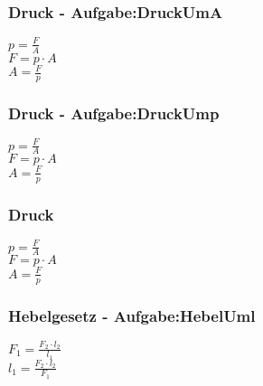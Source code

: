 \subsubsection{Druck - Aufgabe:DruckUmA} 
\begin{minipage}{0.45\textwidth} 
$ p = \frac{F}{A} $\\ 
$ F = p\cdot A $\\ 
$ A = \frac{F}{p} $\\ 
\end{minipage} 
\begin{minipage}{0.45\textwidth} 
 
\end{minipage} 
\subsubsection{Druck - Aufgabe:DruckUmp} 
\begin{minipage}{0.45\textwidth} 
$ p = \frac{F}{A} $\\ 
$ F = p\cdot A $\\ 
$ A = \frac{F}{p} $\\ 
\end{minipage} 
\begin{minipage}{0.45\textwidth} 
 
\end{minipage} 
\subsubsection{Druck} 
\begin{minipage}{0.45\textwidth} 
$ p = \frac{F}{A} $\\ 
$ F = p\cdot A $\\ 
$ A = \frac{F}{p} $\\ 
\end{minipage} 
\begin{minipage}{0.45\textwidth} 
 
\end{minipage} 
\subsubsection{Hebelgesetz - Aufgabe:HebelUml} 
\begin{minipage}{0.45\textwidth} 
$ F_{1}  = \frac{F_{2} \cdot l_{2} }{ l_{1} } $\\ 
$ l_{1}  = \frac{F_{2} \cdot l_{2} }{ F_{1} } $\\ 
\end{minipage} 
\begin{minipage}{0.45\textwidth} 
 
\end{minipage} 
